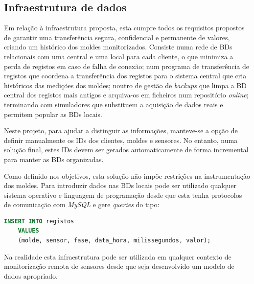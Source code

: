 \documentclass[11pt,twoside,a4paper]{report}
\begin{document}
\subsection{Infraestrutura de dados}
Em relação à infraestrutura proposta, esta cumpre todos os requisitos propostos de garantir uma transferência segura, confidencial e permanente de valores, criando um histórico dos moldes monitorizados. Consiste numa rede de BDs relacionais com uma central e uma local para cada cliente, o que minimiza a perda de registos em caso de falha de conexão; num programa de transferência de registos que coordena a transferência dos registos para o sistema central que cria históricos das medições dos moldes; noutro de gestão de \textit{backups} que limpa a BD central dos registos mais antigos e arquiva-os em ficheiros num repositório \textit{online}; terminando com simuladores que substituem a aquisição de dados reais e permitem popular as BDs locais.\par 
Neste projeto, para ajudar a distinguir as informações, manteve-se a opção de definir manualmente os IDs dos clientes, moldes e sensores. No entanto, numa solução final, estes IDs devem ser gerados automaticamente de forma incremental para manter as BDs organizadas.\par 
Como definido nos objetivos, esta solução não impõe restrições na instrumentação dos moldes. Para introduzir dados nas BDs locais pode ser utilizado qualquer sistema operativo e linguagem de programação desde que esta tenha protocolos de comunicação com \textit{MySQL} e gere \textit{queries} do tipo:
\begin{lstlisting}[language = SQL]
	INSERT INTO registos
	VALUES
	(molde, sensor, fase, data_hora, milissegundos, valor);
\end{lstlisting}
Na realidade esta infraestrutura pode ser utilizada em qualquer contexto de monitorização remota de sensores desde que seja desenvolvido um modelo de dados apropriado.\par
\end{document}
